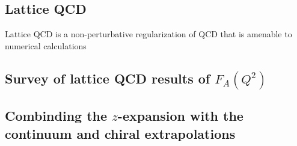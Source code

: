 \subsection{Lattice QCD\label{sec:lqcd_intro}}
Lattice QCD is a non-perturbative regularization of QCD that is amenable to numerical calculations



\subsection{Survey of lattice QCD results of $F_A(Q^2)$\label{sec:lqcd_results}}



\subsection{Combinding the $z$-expansion with the continuum and chiral extrapolations\label{sec:z_continuum}}
